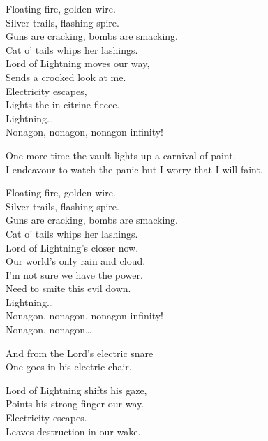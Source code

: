 Floating fire, golden wire. \\
Silver trails, flashing spire. \\
Guns are cracking, bombs are smacking. \\
Cat o' tails whips her lashings. \\

Lord of Lightning moves our way, \\
Sends a crooked look at me. \\
Electricity escapes, \\
Lights the  in citrine fleece. \\

Lightning… \\

Nonagon, nonagon, nonagon infinity! \\


One more time the vault lights up a carnival of paint. \\
I endeavour to watch the panic but I worry that I will faint. \\


Floating fire, golden wire. \\
Silver trails, flashing spire. \\
Guns are cracking, bombs are smacking. \\
Cat o' tails whips her lashings. \\

Lord of Lightning's closer now. \\
Our world's only rain and cloud. \\
I'm not sure we have the power. \\
Need to smite this evil down. \\

Lightning… \\

Nonagon, nonagon, nonagon infinity! \\
Nonagon, nonagon… \\


And from the Lord's electric snare \\
One goes in his electric chair. \\


Lord of Lightning shifts his gaze, \\
Points his strong finger our way. \\
Electricity escapes. \\
Leaves destruction in our wake. \\

